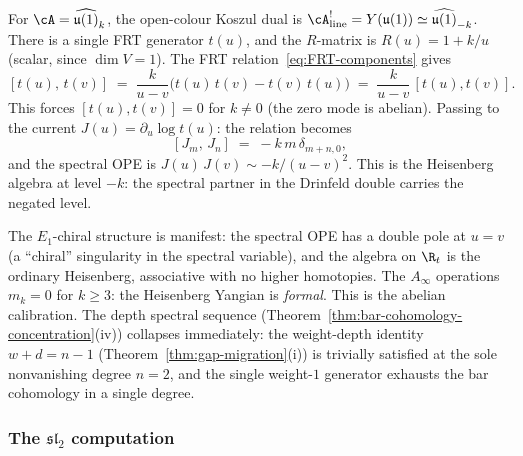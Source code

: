 \begin{computation}
\label{comp:heisenberg-E1-chiral}
For $\cA = \widehat{\mathfrak{u}(1)}_k$, the open-colour Koszul
dual is
$\cA^!_{\mathrm{line}} = Y(\mathfrak{u}(1))
\simeq \widehat{\mathfrak{u}(1)}_{-k}$.
There is a single FRT generator $t(u)$,
and the $R$-matrix is $R(u) = 1 + k/u$ (scalar, since
$\dim V = 1$). The FRT relation~\eqref{eq:FRT-components}
gives
\[
[t(u),\, t(v)]
\;=\;
\frac{k}{u - v}\bigl(
 t(u)\,t(v) - t(v)\,t(u)
\bigr)
\;=\;
\frac{k}{u - v}\,[t(u), t(v)].
\]
This forces $[t(u), t(v)] = 0$ for $k \ne 0$
\textup(the zero mode is abelian\textup).
Passing to the current $J(u) = \partial_u \log t(u)$: the
relation becomes
\begin{equation}\label{eq:heisenberg-spectral-OPE}
[J_m,\, J_n] \;=\; -k\,m\,\delta_{m+n,0},
\end{equation}
and the spectral OPE is
$J(u)\,J(v) \sim -k/(u-v)^2$.
This is the Heisenberg algebra at level $-k$: the spectral partner
in the Drinfeld double carries the negated level.

The $E_1$-chiral structure is manifest: the spectral OPE has a
double pole at $u = v$ (a ``chiral'' singularity in the spectral
variable), and the algebra on $\R_t$ is the ordinary
Heisenberg, associative with no higher homotopies. The
$A_\infty$ operations $m_k = 0$ for $k \ge 3$: the Heisenberg
Yangian is \emph{formal}. This is the abelian calibration.
The depth spectral sequence (Theorem~\ref{thm:bar-cohomology-concentration}(iv)) collapses immediately: the weight-depth identity $w + d = n - 1$ (Theorem~\ref{thm:gap-migration}(i)) is trivially satisfied at the sole nonvanishing degree $n = 2$, and the single weight-$1$ generator exhausts the bar cohomology in a single degree.
\end{computation}

\subsubsection*{The $\mathfrak{sl}_2$ computation}

